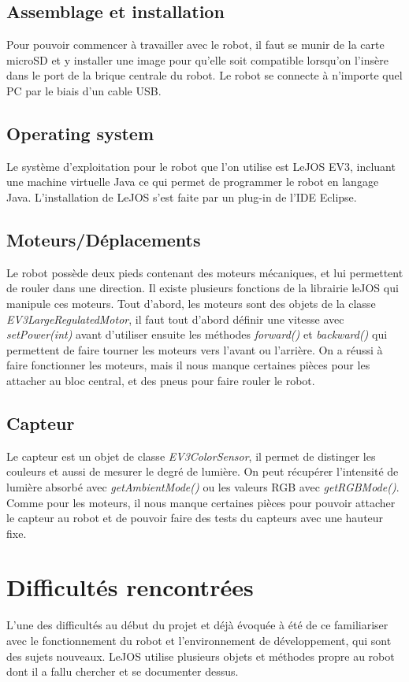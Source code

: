 \documentclass{article}
\begin{document}
\subsection{Assemblage et installation}
Pour pouvoir commencer à travailler avec le robot, il faut se munir de la carte microSD et y installer une image pour qu'elle soit compatible lorsqu'on l'insère dans le port de la brique centrale du robot. Le robot se connecte à n'importe quel PC par le biais d'un cable USB.

\subsection{Operating system}
Le système d'exploitation pour le robot que l'on utilise est LeJOS EV3, incluant une machine virtuelle Java ce qui permet de programmer le robot en langage Java.
L'installation de LeJOS s'est faite par un plug-in de l'IDE Eclipse.

\subsection{Moteurs/Déplacements}
Le robot possède deux pieds contenant des moteurs mécaniques, et lui permettent de rouler dans une direction. Il existe plusieurs fonctions de la librairie leJOS qui manipule ces moteurs. Tout d'abord, les moteurs sont des objets de la classe {\it EV3LargeRegulatedMotor}, il faut tout d'abord définir une vitesse avec {\it setPower(int)} avant d'utiliser ensuite les méthodes {\it forward()} et {\it backward()} qui permettent de faire tourner les moteurs vers l'avant ou l'arrière.
On a réussi à faire fonctionner les moteurs, mais il nous manque certaines pièces pour les attacher au bloc central, et des pneus pour faire rouler le robot.

\subsection{Capteur}
Le capteur est un objet de classe {\it EV3ColorSensor}, il permet de distinger les couleurs et aussi de mesurer le degré de lumière. On peut récupérer l'intensité de lumière absorbé avec {\it getAmbientMode()} ou les valeurs RGB avec {\it getRGBMode()}. 
Comme pour les moteurs, il nous manque certaines pièces pour pouvoir attacher le capteur au robot et de pouvoir faire des tests du capteurs avec une hauteur fixe.


\section{Difficultés rencontrées}
L'une des difficultés au début du projet et déjà évoquée à été de ce familiariser avec le fonctionnement du robot et l'environnement de développement, qui sont des sujets nouveaux. LeJOS utilise plusieurs objets et méthodes propre au robot dont il a fallu chercher et se documenter dessus.
\end{document}

